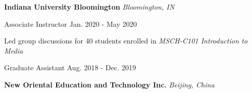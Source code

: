 
\begin{rSection}{}{\bodyfont\bfseries\color{black} \hspace{-1.6em} {Indiana University Bloomington}} \hfill{\bodyfont\slshape\color{awesome} {Bloomington, IN} \vspace{-0.5em}}
\end{rSection}

\begin{cventries}

  \cventry
    {Associate Instructor} %
    {} %
    {} %
    {Jan. 2020 - May 2020} %
    {
      \begin{cvitems} %
        \item[] {Led group discussions for 40 students enrolled in \textit{MSCH-C101 Introduction to Media} }
      \end{cvitems}
    }
  \cventry
    {\hspace{-0.2em}Graduate Assistant\vspace{-0.2em}} %
    {} %
    {} %
    {Aug. 2018 - Dec. 2019\vspace{0.4em}} %
    {
      \begin{cvitems} %
        \item[] 
        \item[] 
      \end{cvitems}
    }   


\begin{rSection}{}{\bodyfont\bfseries\color{darktext} \hspace{-1.6em} {New Oriental Education and Technology Inc.}} \hfill{\bodyfont\slshape\color{awesome} {Beijing, China} \vspace{0.3em}}
\end{rSection}


\end{cventries}
